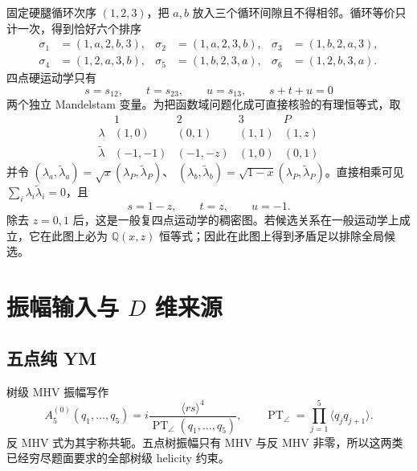 \documentclass[11pt,a4paper,UTF8]{ctexart}
\newcommand{\PT}{\operatorname{PT}}
\begin{document}
固定硬腿循环次序 $(1,2,3)$，把 $a,b$ 放入三个循环间隙且不得相邻。循环等价只计一次，得到恰好六个排序
\begin{align}
\sigma_1&=(1,a,2,b,3), &
\sigma_2&=(1,a,2,3,b), &
\sigma_3&=(1,b,2,a,3),\nonumber\\
\sigma_4&=(1,2,a,3,b), &
\sigma_5&=(1,b,2,3,a), &
\sigma_6&=(1,2,b,3,a).
\label{eq:orders}
\end{align}
四点硬运动学只有
\begin{equation}
s=s_{12},\qquad t=s_{23},\qquad u=s_{13},\qquad s+t+u=0
\end{equation}
两个独立 Mandelstam 变量。为把函数域问题化成可直接核验的有理恒等式，取
\begin{equation}
\begin{array}{c|cccc}
 &1&2&3&P\\ \hline
\lambda &(1,0)&(0,1)&(1,1)&(1,z)\\
\widetilde\lambda&(-1,-1)&(-1,-z)&(1,0)&(0,1)
\end{array}
\label{eq:chart}
\end{equation}
并令 $(\lambda_a,\widetilde\lambda_a)=\sqrt{x}(\lambda_P,\widetilde\lambda_P)$、
$(\lambda_b,\widetilde\lambda_b)=\sqrt{1-x}(\lambda_P,\widetilde\lambda_P)$。直接相乘可见
$\sum_i\lambda_i\widetilde\lambda_i=0$，且
\begin{equation}
s=1-z,\qquad t=z,\qquad u=-1.
\label{eq:stu-chart}
\end{equation}
除去 $z=0,1$ 后，这是一般复四点运动学的稠密图。若候选关系在一般运动学上成立，它在此图上必为 $\mathbb Q(x,z)$ 恒等式；因此在此图上得到矛盾足以排除全局候选。

\section{振幅输入与 $D$ 维来源}

\subsection{五点纯 YM}

树级 MHV 振幅写作
\begin{equation}
A_5^{(0)}(q_1,\ldots,q_5)
=i\frac{\langle r s\rangle^4}{\PT_\angle(q_1,\ldots,q_5)},
\qquad
\PT_\angle=\prod_{j=1}^{5}\langle q_jq_{j+1}\rangle .
\end{equation}
反 MHV 式为其宇称共轭。五点树振幅只有 MHV 与反 MHV 非零，所以这两类已经穷尽题面要求的全部树级 helicity 约束。
\end{document}
